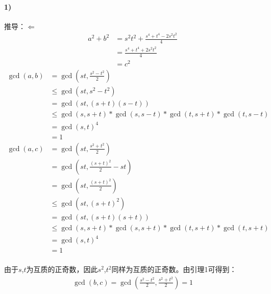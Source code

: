 \documentclass[UTF8]{ctexart}
\begin{document}
	\paragraph{1)} 推导：$\Leftarrow$
	\begin{equation}\label{abc_equation}
		\begin{aligned}
			a^2+b^2&=s^2t^2+\frac{s^4+t^4-2s^2t^2}{4}\\
			       &=\frac{s^4+t^4+2s^2t^2}{4}\\
				   &=c^2
		\end{aligned}
	\end{equation}
	\begin{equation}\label{ab_gcd}
		\begin{aligned}
			\gcd(a,b)&=\gcd(st,\frac{s^2-t^2}{2})\\
			         &{\leq}\gcd(st,s^2-t^2)\\
					 &=\gcd(st,(s+t)(s-t))\\
					 &{\leq}\gcd(s,s+t)*\gcd(s,s-t)*\gcd(t,s+t)*\gcd(t,s-t)\\
					 &=\gcd(s,t)^4\\
					 &=1
		\end{aligned}
	\end{equation}
	\begin{equation}\label{ac_gcd}
		\begin{aligned}
			\gcd(a,c)&=\gcd(st,\frac{s^2+t^2}{2})\\
			         &=\gcd(st,\frac{(s+t)^2}{2}-st)\\
					 &=\gcd(st,\frac{(s+t)^2}{2})\\
					 &{\leq}\gcd(st,(s+t)^2)\\
					 &=\gcd(st,(s+t)(s+t))\\
					 &{\leq}\gcd(s,s+t)*\gcd(s,s+t)*\gcd(t,s+t)*\gcd(t,s+t)\\
					 &=\gcd(s,t)^4\\
					 &=1
		\end{aligned}
	\end{equation}
	\paragraph{} 由于$s$,$t$为互质的正奇数，因此$s^2$,$t^2$同样为互质的正奇数。由引理1可得到：
	\begin{equation}\label{bc_gcd}
		\begin{aligned}
			\gcd(b,c)=\gcd(\frac{s^2-t^2}{2},\frac{s^2+t^2}{2})=1
		\end{aligned}
	\end{equation}
\end{document}

